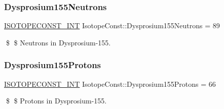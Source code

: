 \subsubsection{\texorpdfstring{Dysprosium155\+Neutrons}{Dysprosium155Neutrons}}
{\footnotesize\ttfamily \mbox{\hyperlink{group___isotope_const-_macros_ga5f18360b3e99483a35c32d789e62621c}{I\+S\+O\+T\+O\+P\+E\+C\+O\+N\+S\+T\+\_\+\+I\+NT}} Isotope\+Const\+::\+Dysprosium155\+Neutrons = 89}

\$ \$ Neutrons in Dysprosium-\/155. \mbox{\label{group___isotope_const-_dysprosium-_dy155_gaa91bef6e4bd32297d423978cc7bd5f9a}} 
\subsubsection{\texorpdfstring{Dysprosium155\+Protons}{Dysprosium155Protons}}
{\footnotesize\ttfamily \mbox{\hyperlink{group___isotope_const-_macros_ga5f18360b3e99483a35c32d789e62621c}{I\+S\+O\+T\+O\+P\+E\+C\+O\+N\+S\+T\+\_\+\+I\+NT}} Isotope\+Const\+::\+Dysprosium155\+Protons = 66}

\$ \$ Protons in Dysprosium-\/155. 